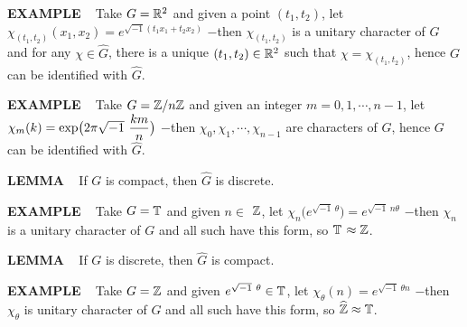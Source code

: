 \vspace{0.1cm}

\begin{x}{\small\bf EXAMPLE} \ %
Take $G = \mathbb{R}^2$ and given a point $(t_1,t_2)$, let $\chi_{(t_1,t_2)}(x_1,x_2) = e^{\sqrt{-1}(t_1x_1 + t_2x_2)}$ 
$-$then $\chi_{(t_1,t_2)}$ is a unitary character of $G$ and for any $\chi \in \widehat{G}$, 
there is a unique $(t_1,t_2) \in \mathbb{R}^2$ such that $\chi = \chi_{(t_1,t_2)}$, 
hence $G$ can be identified with $\widehat{G}$.
\end{x}

\vspace{0.1cm}

\begin{x}{\small\bf EXAMPLE} \ %
Take $G = \mathbb{Z}/ n\mathbb{Z}$ and given an integer $m = 0, 1, \dotsb, n-1$, let 
$
\chi_m(k) = \exp\bigl(2\pi \sqrt{-1} \ \ds\frac{km}{n}\bigr)
$
$-$then $\chi_0, \chi_1, \dotsb, \chi_{n-1}$ are characters of $G$, hence $G$ can be identified with $\widehat{G}$.
\end{x}

\vspace{0.1cm}

\begin{x}{\small\bf LEMMA} \ %
If $G$ is compact, then $\widehat{G}$ is discrete.
\end{x}

\vspace{0.1cm}

\begin{x}{\small\bf EXAMPLE} \ %
Take $G = \mathbb{T}$ and given $n \in$ $\mathbb{Z}$, let 
$\chi_n\bigl(e^{\sqrt{-1}\ \theta}\bigr ) = e^{\sqrt{-1} \ n\theta}$ 
$-$then $\chi_n$ is a unitary character of $G$ and all such have this form, so $\mathbb{T}$ $\approx \mathbb{Z}$.
\end{x}

\vspace{0.1cm}

\begin{x}{\small\bf LEMMA} \ %
If $G$ is discrete, then $\widehat{G}$ is compact.
\end{x}

\vspace{0.1cm}

\begin{x}{\small\bf EXAMPLE} \ %
Take $G = \mathbb{Z}$ and given $e^{\sqrt{-1}\ \theta}  \in \mathbb{T}$, let $\chi_\theta(n) = e^{\sqrt{-1} \ \theta n}$ 
$-$then $\chi_\theta$ is unitary character of $G$ and all such have this form, so $\widehat{\mathbb{Z}} \approx \mathbb{T}$.
\end{x}

